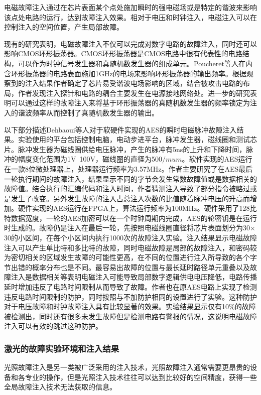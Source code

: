 \documentclass[a4paper,12pt]{article}
\begin{document}
\begin{CJK}{UTF8}{gkai}
电磁故障注入通过在芯片表面某个点处施加瞬时的强电磁场或是特定的谐波来影响该点处电路的运行，达到故障注入效果。相对于电压和时钟注入，电磁注入可以在控制注入的空间位置，产生局部故障。

现有的研究表明，电磁故障注入不仅可以完成对数字电路的故障注入，同时还可以影响CMOS环形振荡器。CMOS环形振荡器是CMOS电路中很有代表性的电路结构，可以作为时钟信号发生器和真随机数发生器的组成单元。Poucheret等人在内含环形振荡器的电路表面施加1GHz的电场来影响环形振荡器的输出频率。根据观察到的注入结果作者确定了芯片易受谐波电场影响的区域，结合被攻击电路的布局，作者发现注入探针和电路的耦合主要发生在电源接地网络处。进一步的研究表明可以通过这样的故障注入来将基于环形振荡器的真随机数发生器的频率锁定为注入的谐波频率从而控制了真随机数发生器的输出。

以下部分描述Dehbaoui等人对于软硬件实现的AES的瞬时电磁脉冲故障注入结果。实验使用的平台包括控制电脑，电动步进平台，脉冲发生器，磁线圈和测试芯片。脉冲发生器为磁线圈供给电压脉冲，产生的脉冲有5ns的上升和下降时间，脉冲的幅度变化范围为1V~100V，磁线圈的直径为500$/mu m$。软件实现的AES运行在一款8位微处理器上，处理器运行频率为3.57MHz。作者主要研究了在AES最后一轮执行期间的故障注入，结果显示不同的字节会发生常数故障值或是数据相关的故障值。结合执行的汇编代码和注入时间，作者猜测注入导致了部分指令被略过或是发生了改变。另外发生故障的注入占总注入次数的比值随着脉冲电压的升高而增加。硬件实现的AES运行在FPGA上，算法运行频率为100MHz。硬件采用了128比特数据宽度，一轮的AES加密可以在一个时钟周期内完成，AES的轮密钥是在运行时生成的。故障仍是注入在最后一轮，先按照电磁线圈直径将芯片表面划分为30$\times$30的小区间，在每个小区间内执行1000次的故障注入实验。注入结果显示电磁故障注入可以产生单比特和多比特的故障，同时电磁故障是局部的故障注入，和密码较为密切相关的区域发生故障的可能性更高，在不同的位置进行注入所导致的各个字节出错的概率分布也是不同。最容易出故障的位置与最长延时路径单元重叠以及故障注入是数据相关等表明电磁注入可能导致局部数字逻辑供电电压降低，电路传播延时增加违反了电路时间限制从而导致了故障。作者也在原AES电路上实现了检测违反电路时间限制的防护，同时按照与不加防护相同的设置进行了实验。这种防护对于电压故障和时钟故障注入具有比较显著的效果。实验结果显示仅有10\%的故障被检测出，同时还有很多未发生故障但是检测电路有警报的情况，这说明电磁故障注入可以有效的跳过这种防护。

\subsubsection{激光的故障实验环境和注入结果}

光照故障注入是另一类被广泛采用的注入技术，光照故障注入通常需要更昂贵的设备和各专业的操作，但是光照注入技术往往可以达到比较好的空间精度，获得一些全局故障注入技术无法获取的信息。
 

\end{CJK}
\end{document}
